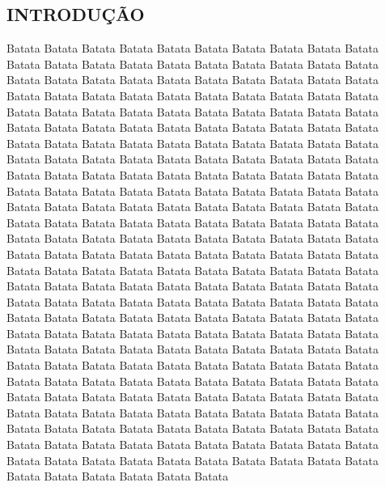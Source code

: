 \begin{flushright}
\justify
\titleformat{\section}{\large\bfseries}{\thesection}{1em}{}
\section{INTRODUÇÃO}
\vspace{0.5cm}

Batata Batata Batata Batata Batata Batata Batata Batata Batata Batata Batata Batata 
Batata Batata Batata Batata Batata Batata Batata Batata Batata Batata Batata Batata 
Batata Batata Batata Batata Batata Batata Batata Batata Batata Batata Batata Batata 
Batata Batata Batata Batata Batata Batata Batata Batata Batata Batata Batata Batata 
Batata Batata Batata Batata Batata Batata Batata Batata Batata Batata Batata Batata 
Batata Batata Batata Batata Batata Batata Batata Batata Batata Batata Batata Batata 
Batata Batata Batata Batata Batata Batata Batata Batata Batata Batata Batata Batata 
Batata Batata Batata Batata Batata Batata Batata Batata Batata Batata Batata Batata 
Batata Batata Batata Batata Batata Batata Batata Batata Batata Batata Batata Batata 
Batata Batata Batata Batata Batata Batata Batata Batata Batata Batata Batata Batata 
Batata Batata Batata Batata Batata Batata Batata Batata Batata Batata Batata Batata 
Batata Batata Batata Batata Batata Batata Batata Batata Batata Batata Batata Batata 
Batata Batata Batata Batata Batata Batata Batata Batata Batata Batata Batata Batata 
Batata Batata Batata Batata Batata Batata Batata Batata Batata Batata Batata Batata 
Batata Batata Batata Batata Batata Batata Batata Batata Batata Batata Batata Batata 
Batata Batata Batata Batata Batata Batata Batata Batata Batata Batata Batata Batata 
Batata Batata Batata Batata Batata Batata Batata Batata Batata Batata Batata Batata 
Batata Batata Batata Batata Batata Batata Batata Batata Batata Batata Batata Batata 
Batata Batata Batata Batata Batata Batata Batata Batata Batata Batata Batata Batata 
Batata Batata Batata Batata Batata Batata Batata Batata Batata Batata Batata Batata 
Batata Batata Batata Batata Batata Batata Batata Batata Batata Batata Batata Batata 
Batata Batata Batata Batata Batata Batata Batata Batata Batata Batata Batata Batata 
Batata Batata Batata Batata Batata Batata Batata Batata Batata Batata Batata Batata 


\end{flushright}
